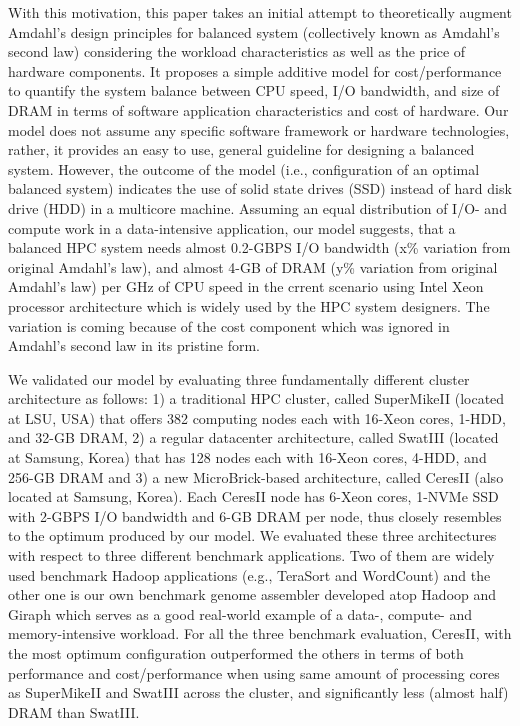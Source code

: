 \documentclass[journal]{IEEEtran}
\begin{document}
With this motivation, this paper takes an initial attempt to theoretically augment Amdahl's design principles for balanced system (collectively known as Amdahl's second law)  considering the workload characteristics as well as the price of hardware components. It proposes a simple additive model for cost/performance to quantify the system balance between CPU speed, I/O bandwidth, and size of DRAM in terms of software application characteristics and cost of hardware. Our model does not assume any specific software framework or hardware technologies, rather, it provides an easy to use, general guideline for designing a balanced system. However, the outcome of the model (i.e., configuration of an optimal balanced system) indicates the use of solid state drives (SSD) instead of hard disk drive (HDD) in a multicore machine. Assuming an equal distribution of I/O-  and compute work in a data-intensive application, our model suggests, that a balanced HPC system needs almost 0.2-GBPS I/O bandwidth (x\% variation from original Amdahl's law), and almost 4-GB of DRAM (y\% variation from original Amdahl's law) per GHz of CPU speed in the crrent scenario using Intel Xeon processor architecture which is widely used by the HPC system designers. The variation is coming because of the cost component which was ignored in Amdahl's second law in its pristine form. 


We validated our model by evaluating three fundamentally different cluster architecture as follows: 1) a traditional HPC cluster, called SuperMikeII (located at LSU, USA) that offers 382 computing nodes each with 16-Xeon cores, 1-HDD, and 32-GB DRAM, 2) a regular datacenter architecture, called SwatIII (located at Samsung, Korea) that has 128 nodes each with 16-Xeon cores, 4-HDD, and 256-GB DRAM and 3) a new MicroBrick-based architecture, called CeresII (also located at Samsung, Korea). Each CeresII node has  6-Xeon cores, 1-NVMe SSD  with 2-GBPS I/O bandwidth and 6-GB DRAM per node, thus closely resembles to the optimum produced by our model. We evaluated these three architectures with respect to three different benchmark applications. Two of them are widely  used benchmark Hadoop applications (e.g., TeraSort and WordCount) and the other one is our own benchmark genome assembler developed atop Hadoop and Giraph which serves as a good real-world example of a data-, compute- and memory-intensive workload. For all the three benchmark evaluation, CeresII, with the most optimum configuration outperformed the others in terms of both performance and cost/performance when using same amount of processing cores as SuperMikeII and SwatIII across the cluster, and significantly less (almost half) DRAM than SwatIII. 
\end{document}
